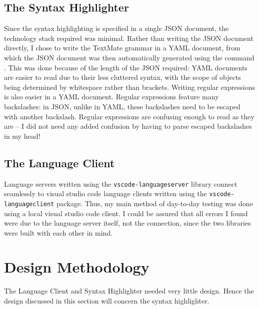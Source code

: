 \documentclass[../main.tex]{subfiles}
\begin{document}
\subsection{The Syntax Highlighter}
Since the syntax highlighting is specified in a single JSON document, the technology stack required was minimal. Rather than writing the JSON document directly, I chose to write the TextMate grammar in a YAML document, from which the JSON document was then automatically generated using the command  \cite{yq_repo}. This was done because of the length of the JSON required: YAML documents are easier to read due to their less cluttered syntax, with the scope of objects being determined by whitespace rather than brackets. Writing regular expressions is also easier in a YAML document. Regular expressions feature many backslashes: in JSON, unlike in YAML, these backslashes need to be escaped with another backslash. Regular expressions are confusing enough to read as they are -- I did not need any added confusion by having to parse escaped backslashes in my head!

\subsection{The Language Client}
Language servers written using the \texttt{vscode-languageserver} library connect seamlessly to visual studio code language clients written using the \texttt{vscode-languageclient} package. Thus, my main method of day-to-day testing was done using a local visual studio code client. I could be assured that all errors I found were due to the language server itself, not the connection, since the two libraries were built with each other in mind. 
%
%
%
\section{Design Methodology}
The Language Client and Syntax Highlighter needed very little design. Hence the design discussed in this section will concern the syntax highlighter.
\end{document}

